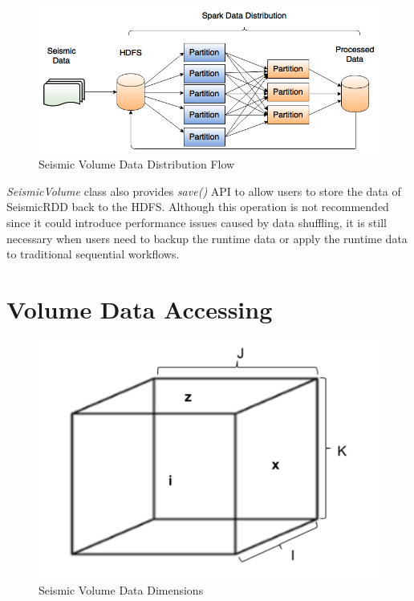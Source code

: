 \begin{figure}[h]
\centering
\includegraphics[scale=0.6]{figures/datadist.png}
\caption{Seismic Volume Data Distribution Flow}
\label{datadist}
\end{figure}

\emph{SeismicVolume} class also provides \emph{save()} API to allow users to store the data of SeismicRDD back to the HDFS. Although this operation is not recommended since it could introduce performance issues caused by data shuffling, it is still necessary when users need to backup the runtime data or apply the runtime data to traditional sequential workflows.


\section{Volume Data Accessing}

\begin{figure}[h]
\centering
\includegraphics[scale=0.6]{figures/VolumeDim.png}
\caption{Seismic Volume Data Dimensions}
\label{VolumeDim}
\end{figure}

